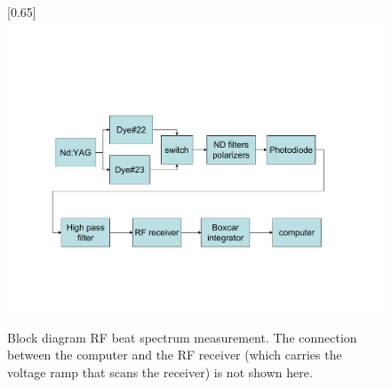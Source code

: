 \begin{figure}
\scalebox{0.65}[0.65]{
\includegraphics*[bb=55 87 640 383]
{block/block.pdf}
}
\caption[Block diagram RF beat spectrum measurement]{Block diagram RF beat spectrum measurement. The connection between the computer and the RF receiver (which carries the voltage ramp that scans the receiver) is not shown here.}
\label{block}
\end{figure}
